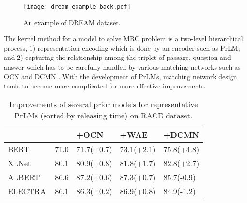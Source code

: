 \documentclass[letterpaper]{article} \usepackage{aaai21}  \usepackage{times}  \usepackage{helvet} \usepackage{courier}  \usepackage[hyphens]{url}  \usepackage{graphicx} \urlstyle{rm} \def\UrlFont{\rm}  \usepackage{natbib}  \usepackage{caption} \frenchspacing  \setlength{\pdfpagewidth}{8.5in}  \setlength{\pdfpageheight}{11in}
\begin{document}
\begin{figure}
	\centering
	\texttt{[image: dream\_example\_back.pdf]}
	\caption{\label{tab:example_dream} An example of DREAM dataset.}
\end{figure}

The kernel method for a model to solve MRC problem is a two-level hierarchical process, 1) representation encoding which is done by an encoder such as PrLM; and 2) capturing the relationship among the triplet of passage, question and answer which has to be carefully handled by various matching networks such as OCN \cite{ocn} and DCMN \cite{dcmn}. With the development of PrLMs, matching network design tends to become more complicated for more effective improvements. 

\begin{table}[h]\small
\renewcommand\arraystretch{1.3}
	\centering
	{
		\begin{tabular}{@{}p{1.9cm}|@{}p{0.45cm}|l|l|p{1.3cm}}
			\hline		
			 		& & +OCN & +WAE & +DCMN \\
			\hline
			\hline
			BERT  & \,71.0 & 71.7(+0.7) & 73.1(+2.1)& 75.8(+4.8) \\
			XLNet& \,80.1 & 80.9(+0.8) & 81.8(+1.7)& 82.8(+2.7) \\
			ALBERT  & \,86.6  & 87.2(+0.6) & 87.3(+0.7) & 85.7(-0.9) \\
			ELECTRA  &  \,86.1 & 86.3(+0.2) & 86.9(+0.8)&  84.9(-1.2)\\
			\hline
		\end{tabular}
		
	}
	\caption{Improvements of several prior models for representative PrLMs (sorted by releasing time) on RACE dataset.}
	\label{lm_and_net_compare}
\end{table}
\end{document}
